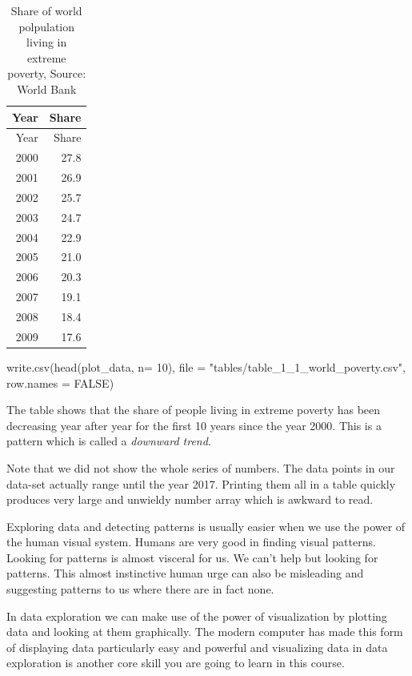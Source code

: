 \documentclass[
  letterpaper,
]{scrbook}
\newenvironment{Shaded}{\begin{snugshade}}{\end{snugshade}}
\newcommand{\AttributeTok}[1]{\textcolor[rgb]{0.40,0.45,0.13}{#1}}
\newcommand{\ConstantTok}[1]{\textcolor[rgb]{0.56,0.35,0.01}{#1}}
\newcommand{\DecValTok}[1]{\textcolor[rgb]{0.68,0.00,0.00}{#1}}
\newcommand{\FunctionTok}[1]{\textcolor[rgb]{0.28,0.35,0.67}{#1}}
\newcommand{\NormalTok}[1]{\textcolor[rgb]{0.00,0.23,0.31}{#1}}
\newcommand{\StringTok}[1]{\textcolor[rgb]{0.13,0.47,0.30}{#1}}
\begin{document}
\hypertarget{tbl-example-poverty}{}
\begin{longtable}[]{@{}rr@{}}
\caption{\label{tbl-example-poverty}Share of world polpulation living in
extreme poverty, Source: World Bank}\tabularnewline
\toprule()
Year & Share \\
\midrule()
\endfirsthead
\toprule()
Year & Share \\
\midrule()
\endhead
2000 & 27.8 \\
2001 & 26.9 \\
2002 & 25.7 \\
2003 & 24.7 \\
2004 & 22.9 \\
2005 & 21.0 \\
2006 & 20.3 \\
2007 & 19.1 \\
2008 & 18.4 \\
2009 & 17.6 \\
\bottomrule()
\end{longtable}

\begin{Shaded}
\begin{Highlighting}[]
\FunctionTok{write.csv}\NormalTok{(}\FunctionTok{head}\NormalTok{(plot\_data, }\AttributeTok{n=} \DecValTok{10}\NormalTok{), }\AttributeTok{file =} \StringTok{"tables/table\_1\_1\_world\_poverty.csv"}\NormalTok{, }\AttributeTok{row.names =} \ConstantTok{FALSE}\NormalTok{)}
\end{Highlighting}
\end{Shaded}

The table shows that the share of people living in extreme poverty has
been decreasing year after year for the first 10 years since the year
2000. This is a pattern which is called a \emph{downward trend}.

Note that we did not show the whole series of numbers. The data points
in our data-set actually range until the year 2017. Printing them all in
a table quickly produces very large and unwieldy number array which is
awkward to read.

Exploring data and detecting patterns is usually easier when we use the
power of the human visual system. Humans are very good in finding visual
patterns. Looking for patterns is almost visceral for us. We can't help
but looking for patterns. This almost instinctive human urge can also be
misleading and suggesting patterns to us where there are in fact none.

In data exploration we can make use of the power of visualization by
plotting data and looking at them graphically. The modern computer has
made this form of displaying data particularly easy and powerful and
visualizing data in data exploration is another core skill you are going
to learn in this course.
\end{document}
